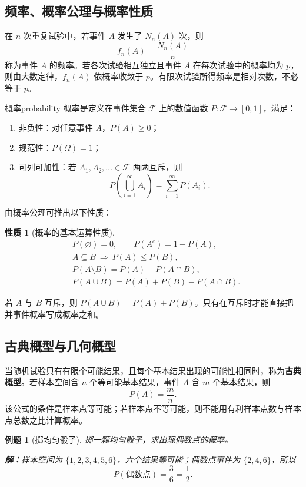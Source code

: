 \documentclass[11pt,a4paper,fontset=fandol]{ctexart}
\newtheorem{property}[theorem]{性质}
\newtheorem{example}{例题}[section]
\theoremstyle{remark}
\begin{document}
\subsection{频率、概率公理与概率性质}
在 $n$ 次重复试验中，若事件 $A$ 发生了 $N_n(A)$ 次，则
\[
    f_n(A)=\frac{N_n(A)}{n}
\]
称为事件 $A$ 的频率。若各次试验相互独立且事件 $A$ 在每次试验中的概率均为 $p$，则由大数定律，$f_n(A)$ 依概率收敛于 $p$。有限次试验所得频率是相对次数，不必等于 $p$。

\begin{definition}{概率}{probability}
概率是定义在事件集合 $\mathcal{F}$ 上的数值函数 $P:\mathcal{F}\to[0,1]$，满足：
\begin{enumerate}
    \item 非负性：对任意事件 $A$，$P(A)\geq 0$；
    \item 规范性：$P(\Omega)=1$；
    \item 可列可加性：若 $A_1,A_2,\ldots\in\mathcal{F}$ 两两互斥，则
    \[
        P\left(\bigcup_{i=1}^{\infty}A_i\right)
        =\sum_{i=1}^{\infty}P(A_i).
    \]
\end{enumerate}
\end{definition}

由概率公理可推出以下性质：
\begin{property}[概率的基本运算性质]
\[
\begin{aligned}
    &P(\varnothing)=0,\qquad P(A^c)=1-P(A),\\
    &A\subseteq B\ \Longrightarrow\ P(A)\leq P(B),\\
    &P(A\setminus B)=P(A)-P(A\cap B),\\
    &P(A\cup B)=P(A)+P(B)-P(A\cap B).
\end{aligned}
\]
\end{property}
若 $A$ 与 $B$ 互斥，则 $P(A\cup B)=P(A)+P(B)$。只有在互斥时才能直接把并事件概率写成概率之和。

\subsection{古典概型与几何概型}
当随机试验只有有限个可能结果，且每个基本结果出现的可能性相同时，称为\textbf{古典概型}。若样本空间含 $n$ 个等可能基本结果，事件 $A$ 含 $m$ 个基本结果，则
\[
    P(A)=\frac{m}{n}.
\]
该公式的条件是样本点等可能；若样本点不等可能，则不能用有利样本点数与样本点总数之比计算概率。

\begin{example}[掷均匀骰子]
掷一颗均匀骰子，求出现偶数点的概率。

\textbf{解：}样本空间为 $\{1,2,3,4,5,6\}$，六个结果等可能；偶数点事件为 $\{2,4,6\}$，所以
\[
    P(\text{偶数点})=\frac{3}{6}=\frac{1}{2}.
\]
\end{example}
\end{document}
